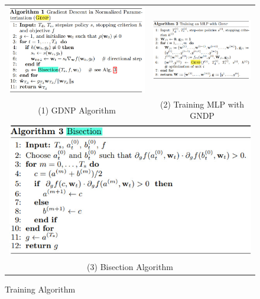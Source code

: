 \documentclass{article}
\begin{document}
\begin{figure}[!ht]
\begin{tabular}{cc}
  \includegraphics[scale=0.38]{pics/batchNorm/decoupling_alg1.jpg} & 
  \includegraphics[scale=0.58]{pics/batchNorm/decoupling_alg2.jpg}
  \\
(1) GDNP Algorithm & (2) Training MLP with GNDP\\[6pt]
\multicolumn{2}{c}{\includegraphics[scale=0.6]{pics/batchNorm/decoupling_alg3.jpg} }\\
\multicolumn{2}{c}{(3) Bisection Algorithm }
\end{tabular}
\caption{Training Algorithm}
\label{fig:algorithms}
\end{figure}
\end{document}
